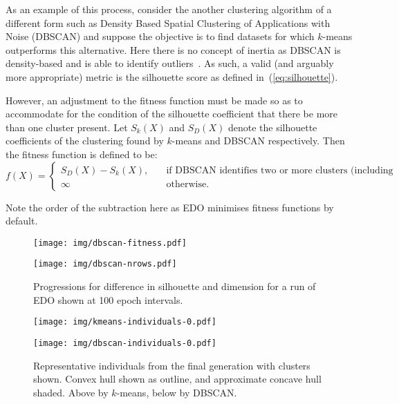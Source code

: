 As an example of this process, consider the another clustering algorithm of a
different form such as Density Based Spatial Clustering of Applications with
Noise (DBSCAN) and suppose the objective is to find datasets for which
\(k\)-means outperforms this alternative. Here there is no concept of inertia as
DBSCAN is density-based and is able to identify outliers~\cite{Ester1996}. As
such, a valid (and arguably more appropriate) metric is the silhouette score as
defined in~(\ref{eq:silhouette}).

However, an adjustment to the fitness function must be made so as to accommodate
for the condition of the silhouette coefficient that there be more than one
cluster present. Let \(S_k (X)\) and \(S_D (X)\) denote the silhouette
coefficients of the clustering found by \(k\)-means and DBSCAN respectively.
Then the fitness function is defined to be:
\[
    f(X) = 
        \begin{cases}
            S_D (X) - S_k (X), &\quad \text{if DBSCAN identifies two or more
            clusters (including noise)}\\
            \infty &\quad \text{otherwise.}
        \end{cases}
\]

Note the order of the subtraction here as EDO minimises fitness functions by
default.

\begin{figure}[htbp]
    \centering
    \begin{minipage}{\imgwidth}
        \centering
        \texttt{[image: img/dbscan-fitness.pdf]}
    \end{minipage}

    \begin{minipage}{\imgwidth}
        \centering
        \texttt{[image: img/dbscan-nrows.pdf]}
    \end{minipage}
    \caption{Progressions for difference in silhouette and dimension for a run
             of EDO shown at 100 epoch
             intervals.}\label{figure:dbscan-silhouette}
\end{figure}

\begin{figure}[htbp]
    \centering
    \texttt{[image: img/kmeans-individuals-0.pdf]}

    \texttt{[image: img/dbscan-individuals-0.pdf]}
    \caption{Representative individuals from the final generation with
             clusters shown. Convex hull shown as outline, and approximate
             concave hull shaded. Above by \(k\)-means, below by
             DBSCAN.}\label{figure:dbscan-individuals}
\end{figure}

